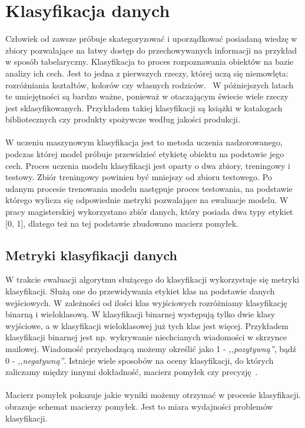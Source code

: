 \chapter{Klasyfikacja danych}

 Człowiek od zawsze próbuje skategoryzować i uporządkować posiadaną wiedzę w zbiory pozwalające na łatwy dostęp do przechowywanych informacji na przykład w sposób tabelaryczny. Klasyfikacja to proces rozpoznawania obiektów na bazie analizy ich cech. Jest to jedna z pierwszych rzeczy, której uczą się niemowlęta: rozróżniania kształtów, kolorów czy własnych rodziców. \ W póżniejszych latach te umiejętności są bardzo ważne, ponieważ w otaczającym świecie wiele rzeczy jest sklasyfikowanych. Przykładem takiej klasyfikacji są książki w katalogach bibliotecznych czy produkty spożywcze według jakości produkcji.
\\ \\
W uczeniu maszynowym klasyfikacja jest to metoda uczenia nadzorowanego, podczas której model próbuje przewidzieć etykietę obiektu na podstawie jego cech. Proces uczenia modelu klasyfikacji jest oparty o dwa zbiory, treningowy i testowy. Zbiór treningowy powinien być mniejszy od zbioru testowego. Po udanym procesie trenowania modelu następuje proces testowania, na podstawie którego wylicza się odpowiednie metryki pozwalające na ewaluacje modelu. W pracy magisterskiej wykorzystano zbiór danych, który posiada dwa typy etykiet [0, 1], dlatego też na tej podstawie zbudowano macierz pomyłek.

\section{Metryki klasyfikacji danych}
W trakcie ewaluacji algorytmu służącego do klasyfikacji wykorzystuje się metryki klasyfikacji. Służą one do przewidywania etykiet klas na podstawie danych wejściowych. W zależności od ilości klas wyjściowych rozróżniamy klasyfikację binarną i wieloklasową. W klasyfikacji binarnej występują tylko dwie klasy wyjściowe, a w klasyfikacji wieloklasowej już tych klas jest więcej. Przykładem klasyfikacji binarnej jest np. wykrywanie niechcianych wiadomości w skrzynce mailowej. Wiadomość przychodzącą możemy określić jako 1 - \textit{,,pozytywną''}, bądź 0 - \textit{,,negatywną''}. Istnieje wiele sposobów na oceny klasyfikacji, do których zaliczamy między innymi dokładność, macierz pomyłek czy precyzję~\cite{Agrawal2024}.
\\ \\
Macierz pomyłek pokazuje jakie wyniki możemy otrzymać w procesie klasyfikacji.  obrazuje schemat macierzy pomyłek. Jest to miara wydajności problemów klasyfikacji.

